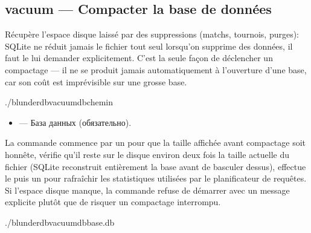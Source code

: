 \documentclass[letterpaper,10pt,russian]{sphinxmanual}
\begin{document}
\subsection{vacuum — Compacter la base de données}
\label{\detokenize{cli:vacuum-compacter-la-base-de-donnees}}
\sphinxAtStartPar
Récupère l’espace disque laissé par des suppressions (matchs, tournois,
purges): SQLite ne réduit jamais le fichier tout seul lorsqu’on supprime des
données, il faut le lui demander explicitement. C’est la seule façon de
déclencher un compactage — il ne se produit jamais automatiquement à
l’ouverture d’une base, car son coût est imprévisible sur une grosse base.

\begin{sphinxVerbatim}[commandchars=\\\{\}]
./blunderdbvacuum\PYGZhy{}\PYGZhy{}db\PYGZlt{}chemin\PYGZgt{}
\end{sphinxVerbatim}

\sphinxAtStartPar
{}
\begin{itemize}
\item {} 
\sphinxAtStartPar
{} — База данных (обязательно).

\end{itemize}

\sphinxAtStartPar
La commande commence par un  pour que la taille
affichée avant compactage soit honnête, vérifie qu’il reste sur le disque
environ deux fois la taille actuelle du fichier (SQLite reconstruit
entièrement la base avant de basculer dessus), effectue le  puis un
 pour rafraîchir les statistiques utilisées par le planificateur de
requêtes. Si l’espace disque manque, la commande refuse de démarrer avec un
message explicite plutôt que de risquer un compactage interrompu.

\sphinxAtStartPar
{}

\begin{sphinxVerbatim}[commandchars=\\\{\}]
./blunderdbvacuum\PYGZhy{}\PYGZhy{}dbbase.db

\end{sphinxVerbatim}
\end{document}
